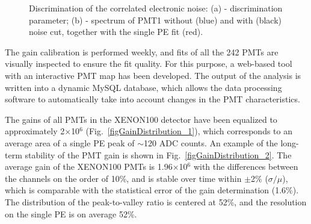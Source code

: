 \begin{figure}[!h]
\centering
{}
\caption[Discrimination of the correlated electronic noise]{Discrimination of the correlated electronic noise: (a) - discrimination parameter; (b) - spectrum of PMT1 without (blue) and with (black) noise cut, together with the single PE fit (red).}
\label{figNoiseDiscrimination}
\end{figure}

The gain calibration is performed weekly, and fits of all the 242 PMTs are visually inspected to ensure the fit quality. For this purpose, a web-based tool with an interactive PMT map has been developed. The output of the analysis is written into a dynamic MySQL database, which allows the data processing software to automatically take into account changes in the PMT characteristics. 

The gains of all PMTs in the XENON100 detector have been equalized to approximately 2$\times$10$^{6}$ (Fig.~\ref{figGainDistribution_1}), which corresponds to an average area of a single PE peak of $\sim$120 ADC counts. An example of the long-term stability of the PMT gain is shown in Fig.~\ref{figGainDistribution_2}. The average gain of the XENON100 PMTs is 1.96$\times$10$^{6}$ with the differences between the channels on the order of 10\%, and is stable over time within $\pm$2\% ($\sigma/\mu$), which is comparable with the statistical error of the gain determination (1.6\%). The distribution of the peak-to-valley ratio is centered at 52\%, and the resolution on the single PE is on average 52\%.

